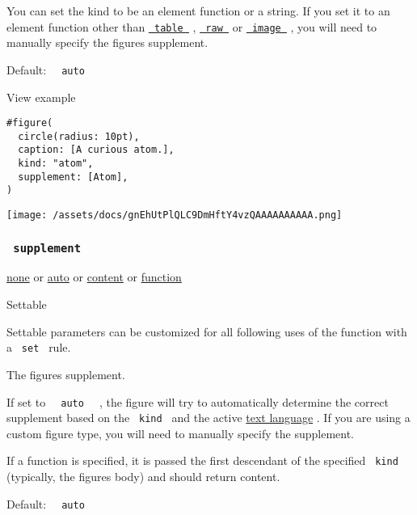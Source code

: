 You can set the kind to be an element function or a string. If you set
it to an element function other than
\href{/docs/reference/model/table/}{\texttt{\ table\ }} ,
\href{/docs/reference/text/raw/}{\texttt{\ raw\ }} or
\href{/docs/reference/visualize/image/}{\texttt{\ image\ }} , you will
need to manually specify the figure\textquotesingle s supplement.

Default: \texttt{\ }{\texttt{\ auto\ }}\texttt{\ }


View example

\begin{verbatim}
#figure(
  circle(radius: 10pt),
  caption: [A curious atom.],
  kind: "atom",
  supplement: [Atom],
)
\end{verbatim}

\texttt{[image: /assets/docs/gnEhUtPlQLC9DmHftY4vzQAAAAAAAAAA.png]}

\subsubsection{\texorpdfstring{\texttt{\ supplement\ }}{ supplement }}\label{parameters-supplement}

\href{/docs/reference/foundations/none/}{none} {or}
\href{/docs/reference/foundations/auto/}{auto} {or}
\href{/docs/reference/foundations/content/}{content} {or}
\href{/docs/reference/foundations/function/}{function}

{{ Settable }}

\label{parameters-supplement-settable-tooltip}
Settable parameters can be customized for all following uses of the
function with a \texttt{\ set\ } rule.

The figure\textquotesingle s supplement.

If set to \texttt{\ }{\texttt{\ auto\ }}\texttt{\ } , the figure will
try to automatically determine the correct supplement based on the
\texttt{\ kind\ } and the active
\href{/docs/reference/text/text/\#parameters-lang}{text language} . If
you are using a custom figure type, you will need to manually specify
the supplement.

If a function is specified, it is passed the first descendant of the
specified \texttt{\ kind\ } (typically, the figure\textquotesingle s
body) and should return content.

Default: \texttt{\ }{\texttt{\ auto\ }}\texttt{\ }

